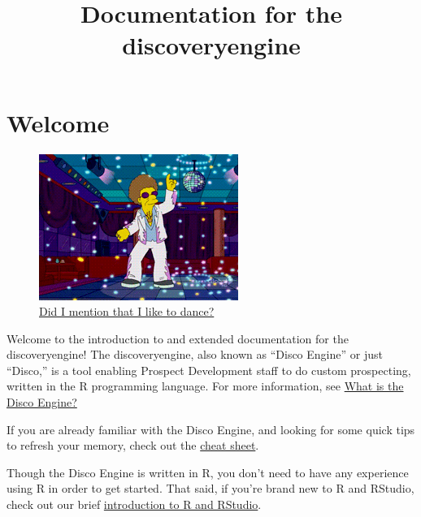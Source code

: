 \documentclass[]{book}
\title{Documentation for the discoveryengine}
\author{}
\date{}
\newenvironment{Shaded}{\begin{snugshade}}{\end{snugshade}}
\newcommand{\DataTypeTok}[1]{\textcolor[rgb]{0.13,0.29,0.53}{#1}}
\newcommand{\KeywordTok}[1]{\textcolor[rgb]{0.13,0.29,0.53}{\textbf{#1}}}
\newcommand{\NormalTok}[1]{#1}
\newcommand{\OperatorTok}[1]{\textcolor[rgb]{0.81,0.36,0.00}{\textbf{#1}}}
\newcommand{\OtherTok}[1]{\textcolor[rgb]{0.56,0.35,0.01}{#1}}
\newcommand{\StringTok}[1]{\textcolor[rgb]{0.31,0.60,0.02}{#1}}
\begin{document}
\maketitle

{
\setcounter{tocdepth}{1}
\tableofcontents
}
\begin{Shaded}
\end{Shaded}

\hypertarget{welcome}{%
\chapter{Welcome}\label{welcome}}

\begin{figure}
\centering
\includegraphics{images/disco.gif}
\caption{\href{https://www.youtube.com/watch?v=uxi73RQlLB8}{Did I mention that I like to dance?}}
\end{figure}

Welcome to the introduction to and extended documentation for the discoveryengine! The discoveryengine, also known as ``Disco Engine'' or just ``Disco,'' is a tool enabling Prospect Development staff to do custom prospecting, written in the R programming language. For more information, see \protect\hyperlink{what-is-disco}{What is the Disco Engine?}

If you are already familiar with the Disco Engine, and looking for some quick tips to refresh your memory, check out the \protect\hyperlink{cheat-sheet}{cheat sheet}.

Though the Disco Engine is written in R, you don't need to have any experience using R in order to get started. That said, if you're brand new to R and RStudio, check out our brief \protect\hyperlink{r-intro}{introduction to R and RStudio}.
\end{document}
